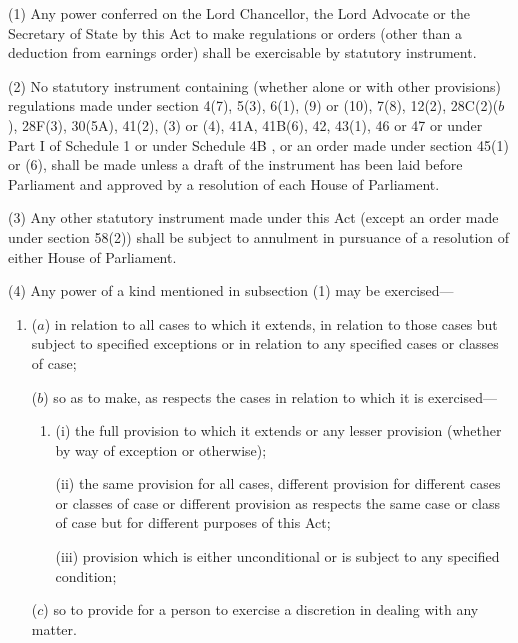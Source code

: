 \documentclass[12pt,a4paper]{article}
\begin{document}
(1) Any power conferred on the Lord Chancellor, the Lord Advocate or the Secretary of State by this Act to make regulations or orders (other than a deduction from earnings order) shall be exercisable by statutory instrument.

(2) No statutory instrument containing (whether alone or with other provisions) regulations made under section 4(7), 5(3), 6(1), (9)  or (10), 7(8), 12(2), 
28C(2)($b$), 28F(3), 30(5A),  %
41(2), (3)  or (4), 
41A, 41B(6),  %
42, 43(1), 46 or 47 or under Part I of Schedule 1
or under Schedule 4B%
, or an order made under section 45(1)  or (6), shall be made unless a draft of the instrument has been laid before Parliament and approved by a resolution of each House of Parliament.

(3) Any other statutory instrument made under this Act (except an order made under section 58(2)) shall be subject to annulment in pursuance of a resolution of either House of Parliament.

(4) Any power of a kind mentioned in subsection (1)  may be exercised—
\begin{enumerate}\item[]
($a$) in relation to all cases to which it extends, in relation to those cases but subject to specified exceptions or in relation to any specified cases or classes of case;

($b$) so as to make, as respects the cases in relation to which it is exercised—
\begin{enumerate}\item[]
(i) the full provision to which it extends or any lesser provision (whether by way of exception or otherwise);

(ii) the same provision for all cases, different provision for different cases or classes of case or different provision as respects the same case or class of case but for different purposes of this Act;

(iii) provision which is either unconditional or is subject to any specified condition;
\end{enumerate}

($c$) so to provide for a person to exercise a discretion in dealing with any matter.
\end{enumerate}

\end{document}
